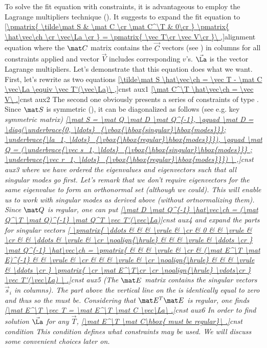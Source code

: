 To solve the fit equation with constraints, it is advantageous to employ the Lagrange multipliers technique (). It suggests to expand the fit equation to 
\eqref{\pmatrix{
\tilde\mat S & \mat C \cr
\mat C^\T & 0\cr
} \pmatrix{
\hat\vec\ch \cr
\vec\La \cr
} = \pmatrix{
\vec T\cr
\vec V\cr
}\ ,}{alignment equation}
where the $\mat C$ matrix contains the $\vec C$ vectors (see ) in columns for all constraints applied and vector $\vec V$ includes corresponding $v$'s. $\vec\La$ is the vector Lagrange multipliers. Let's demonstrate that this equation does what we want. First, let's rewrite as two equations
\eqref{\tilde\mat S \hat\vec\ch = \vec T - \mat C \vec\La \equiv \vec T'(\vec\La)\ ,}{cnst aux1}
\eqref{\mat C^\T \hat\vec\ch = \vec V\ .}{cnst aux2}
The second one obviously presents a series of constraints of type . Since $\mat S$ is symmetric (), it can be diagonalized as follows (see e.g.  key \em{symmetric matrix})
\eqref{\mat S = \mat Q \mat D \mat Q^{-1}, \qquad
\mat D = \diag(\underbrace{0, \ldots}_{\vbox{\hbox{singular}\hbox{modes}}}; \underbrace{\la_1, \ldots}_{\vbox{\hbox{regular}\hbox{modes}}}), \qquad
\mat Q = (\underbrace{\vec s_1, \ldots}_{\vbox{\hbox{singular}\hbox{modes}}} ; \underbrace{\vec r_1, \ldots}_{\vbox{\hbox{regular}\hbox{modes}}})
\ ,}{cnst aux3}
where we have ordered the eigenvalues and eigenvectors such that all singular modes go first. Let's remark that we don't require eigenvectors for the same eigenvalue to form an orthonormal set (although we could). This will enable us to work with singular modes as derived above (without ortnormalizing them). Since $\mat Q$ is regular, one can put
\eqref{\mat D \mat Q^{-1} \hat\vec\ch = (\mat Q^\T \mat Q)^{-1} \mat Q^T \vec T'(\vec\La)}{cnst aux4}
and expand the parts for singular vectors
\eqref{
\pmatrix{
\ddots & & & \vrule & \cr
& 0 & & \vrule & \cr
& & \ddots & \vrule & \cr
\noalign{\hrule}
 & & & \vrule & \ddots \cr
}
\mat Q^{-1} \hat\vec\ch = 
\pmatrix{
& & & \vrule & \cr
& (\mat E^\T \mat E)^{-1} & & \vrule & \cr
& & & \vrule & \cr
\noalign{\hrule}
 & & & \vrule & \ddots \cr
}
\pmatrix{
\cr
\mat E^\T\cr
\cr
\noalign{\hrule}
\vdots\cr
}
\vec T'(\vec\La)
\ .}{cnst aux5}
(The $\mat E$ matrix contains the singular vectors $\vec s_i$ in columns). The part above the vertical line on the \lhs{} is identically equal to zero and thus so the \rhs{} must be. Considering that $\mat E^T \mat E$ is regular, one finds
\eqref{\mat E^\T \vec T = \mat E^\T \mat C \vec\La\ .}{cnst aux6}
In order to find solution $\vec\La$ for any $\vec T$,
\eqref{\mat E^\T \mat C\hbox{ must be regular}\ .}{cnst condition}
This condition defines what constraints may be used. We will discuss some convenient choices later on.

